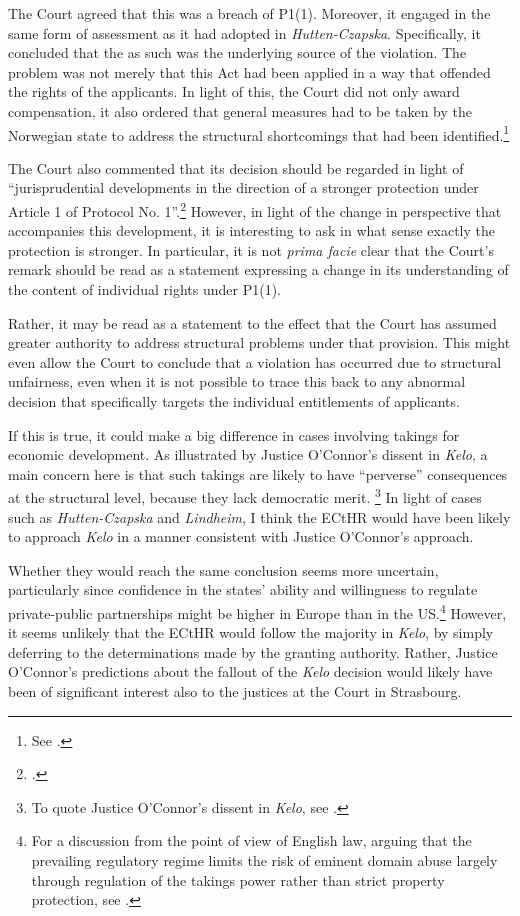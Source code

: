 The Court agreed that this was a breach of P1(1). Moreover, it engaged in the same form of assessment as it had adopted in {\it Hutten-Czapska}. Specifically, it concluded that the \cite{gla96} as such was the underlying source of the violation. The problem was not merely that this Act had been applied in a way that offended the rights of the applicants. In light of this, the Court did not only award compensation, it also ordered that general measures had to be taken by the Norwegian state to address the structural shortcomings that had been identified.\footnote{See \cite{lindheim12}.}

The Court also commented that its decision should be regarded in light of ``jurisprudential developments in the direction of a stronger protection under Article 1 of Protocol No. 1''.\footcite[135]{lindheim12} However, in light of the change in perspective that accompanies this development, it is interesting to ask in what sense exactly the protection is stronger. In particular, it is not {\it prima facie} clear that the Court's remark should be read as a statement expressing a change in its understanding of the content of individual rights under P1(1). 

Rather, it may be read as a statement to the effect that the Court has assumed greater authority to address structural problems under that provision. This might even allow the Court to conclude that a violation has occurred due to structural unfairness, even when it is not possible to trace this back to any abnormal decision that specifically targets the individual entitlements of applicants.

If this is true, it could make a big difference in cases involving takings for economic development. As illustrated by Justice O'Connor's dissent in {\it Kelo}, a main concern here is that such takings are likely to have ``perverse'' consequences at the structural level, because they lack democratic merit. \footnote{To quote Justice O'Connor's dissent in {\it Kelo}, see \cite{kelo05}.} In light of cases such as {\it Hutten-Czapska} and {\it Lindheim}, I think the ECtHR would have been likely to approach {\it Kelo} in a manner consistent with Justice O'Connor's approach.

Whether they would reach the same conclusion seems more uncertain, particularly since confidence in the states' ability and willingness to regulate private-public partnerships might be higher in Europe than in the US.\footnote{For a discussion from the point of view of English law, arguing that the prevailing regulatory regime limits the risk of eminent domain abuse largely through regulation of the takings power rather than strict property protection, see \cite{allen08}.} However, it seems unlikely that the ECtHR would follow the majority in {\it Kelo}, by simply deferring to the determinations made by the granting authority. Rather, Justice O'Connor's predictions about the fallout of the {\it Kelo} decision would likely have been of significant interest also to the justices at the Court in Strasbourg.

